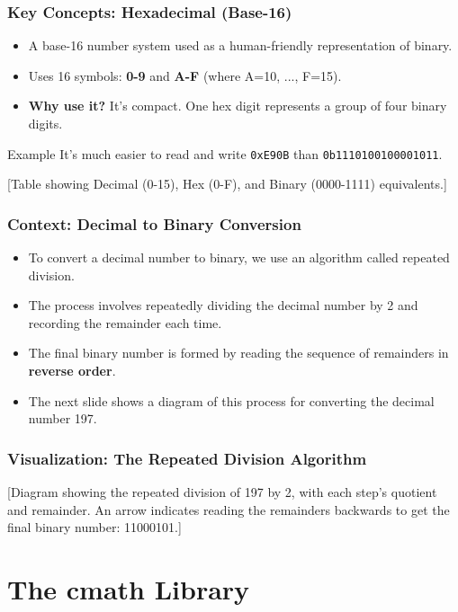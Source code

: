\documentclass{beamer}
\begin{document}
\begin{frame}
\frametitle{Key Concepts: Hexadecimal (Base-16)}
\begin{itemize}
    \item A base-16 number system used as a \alert{human-friendly representation} of binary.
    \item Uses 16 symbols: \textbf{0-9} and \textbf{A-F} (where A=10, ..., F=15).
    \item \textbf{Why use it?} It's compact. One hex digit represents a group of four binary digits.
\end{itemize}
\begin{exampleblock}{Example}
It's much easier to read and write \texttt{0xE90B} than \texttt{0b1110100100001011}.
\end{exampleblock}
\vfill
\alert{[Table showing Decimal (0-15), Hex (0-F), and Binary (0000-1111) equivalents.]}
\end{frame}

\begin{frame}
\frametitle{Context: Decimal to Binary Conversion}
\begin{itemize}
    \item To convert a decimal number to binary, we use an algorithm called \alert{repeated division}.
    \item The process involves repeatedly dividing the decimal number by 2 and recording the remainder each time.
    \item The final binary number is formed by reading the sequence of remainders in \textbf{reverse order}.
    \item The next slide shows a diagram of this process for converting the decimal number 197.
\end{itemize}
\end{frame}

\begin{frame}
\frametitle{Visualization: The Repeated Division Algorithm}
\begin{center}
    \alert{[Diagram showing the repeated division of 197 by 2, with each step's quotient and remainder. An arrow indicates reading the remainders backwards to get the final binary number: 11000101.]}
\end{center}
\end{frame}

\section{The cmath Library}
\end{document}
